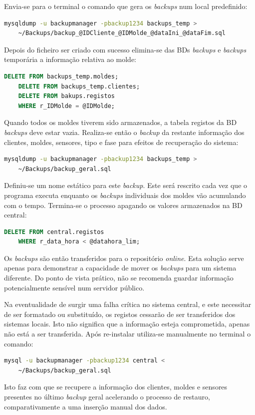 \documentclass[11pt,twoside,a4paper]{report}
\begin{document}
Envia-se para o terminal o comando que gera os \textit{backups} num local predefinido:
\begin{lstlisting}[language = bash]
	mysqldump -u backupmanager -pbackup1234 backups_temp >
	~/Backups/backup_@IDCliente_@IDMolde_@dataIni_@dataFim.sql
\end{lstlisting}
Depois do ficheiro ser criado com sucesso elimina-se das BDs \textit{backups} e \textit{backups} temporária a informação relativa ao molde:
\begin{lstlisting}[language = SQL]
	DELETE FROM backups_temp.moldes;
	DELETE FROM backups_temp.clientes;
	DELETE FROM bakups.registos
	WHERE r_IDMolde = @IDMolde;
\end{lstlisting}
Quando todos os moldes tiverem sido armazenados, a tabela registos da BD \textit{backups} deve estar vazia. Realiza-se então o \textit{backup} da restante informação dos clientes, moldes, sensores, tipo e fase para efeitos de recuperação do sistema:
\begin{lstlisting}[language = bash]
	mysqldump -u backupmanager -pbackup1234 backups_temp >
	~/Backups/backup_geral.sql
\end{lstlisting}
Definiu-se um nome estático para este \textit{backup}. Este será rescrito cada vez que o programa executa enquanto os \textit{backups} individuais dos moldes vão acumulando com o tempo. Termina-se o processo apagando os valores armazenados na BD central:
\begin{lstlisting}[language = SQL]
	DELETE FROM central.registos
	WHERE r_data_hora < @datahora_lim;
\end{lstlisting}
Os \textit{backups} são então transferidos para o repositório \textit{online}. Esta solução serve apenas para demonstrar a capacidade de mover os \textit{backups} para um sistema diferente. Do ponto de vista prático, não se recomenda guardar informação potencialmente sensível num servidor público.\par 
Na eventualidade de surgir uma falha crítica no sistema central, e este necessitar de ser formatado ou substituído, os registos cessarão de ser transferidos dos sistemas locais. Isto não significa que a informação esteja comprometida, apenas não está a ser transferida. Após re-instalar utiliza-se manualmente no terminal o comando:
\begin{lstlisting}[language = bash]
	mysql -u backupmanager -pbackup1234 central <
	~/Backups/backup_geral.sql
\end{lstlisting}
Isto faz com que se recupere a informação dos clientes, moldes e sensores presentes no último \textit{backup} geral acelerando o processo de restauro, comparativamente a uma inserção manual dos dados.\par 
\end{document}
